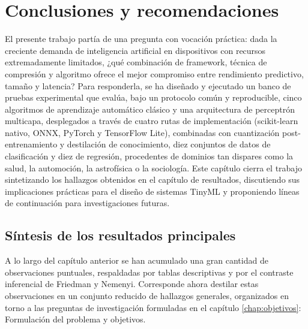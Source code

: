 \documentclass[a4paper,12pt,twoside,final]{book}
\begin{document}
\chapter{Conclusiones y recomendaciones}
El presente trabajo partía de una pregunta con vocación práctica: dada la creciente demanda de inteligencia artificial
en dispositivos con recursos extremadamente limitados, ¿qué combinación de framework, técnica de compresión y algoritmo
ofrece el mejor compromiso entre rendimiento predictivo, tamaño y latencia? Para responderla, se ha diseñado y
ejecutado un banco de pruebas experimental que evalúa, bajo un protocolo común y reproducible, cinco algoritmos de
aprendizaje automático clásico y una arquitectura de perceptrón multicapa, desplegados a través de cuatro rutas de
implementación (scikit-learn nativo, ONNX, PyTorch y TensorFlow Lite), combinadas con cuantización post-entrenamiento y
destilación de conocimiento, diez conjuntos de datos de clasificación y diez de regresión, procedentes de dominios tan
dispares como la salud, la automoción, la astrofísica o la sociología. Este capítulo cierra el trabajo sintetizando los
hallazgos obtenidos en el capítulo de resultados, discutiendo sus implicaciones prácticas para el diseño de sistemas
TinyML y proponiendo líneas de continuación para investigaciones futuras.
 
\section{Síntesis de los resultados principales}
A lo largo del capítulo anterior se han acumulado una gran cantidad de observaciones puntuales, respaldadas por
tablas descriptivas y por el contraste inferencial de Friedman y Nemenyi. Corresponde ahora destilar estas
observaciones en un conjunto reducido de hallazgos generales, organizados en torno a las preguntas de investigación
formuladas en el capítulo \autoref{chap:objetivos}: Formulación del problema y objetivos.
 
\end{document}
